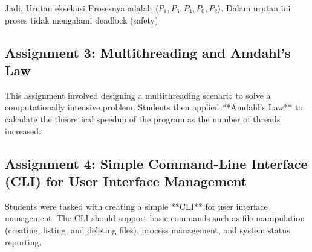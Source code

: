 \documentclass[12pt]{article}
\begin{document}
\begin{table}[H]
    \centering %
    \caption{Tabel Algoritma Safety} %
    \label{tab:your_table2} 
\end{table}

Jadi, Urutan eksekusi Prosesnya adalah  \( \langle P_1, P_3, P_4, P_0, P_2 \rangle \). Dalam urutan ini proses tidak mengalami deadlock (safety)

\subsection{Assignment 3: Multithreading and Amdahl's Law}
This assignment involved designing a multithreading scenario to solve a computationally intensive problem. Students then applied **Amdahl's Law** to calculate the theoretical speedup of the program as the number of threads increased.

\subsection{Assignment 4: Simple Command-Line Interface (CLI) for User Interface Management}
Students were tasked with creating a simple **CLI** for user interface management. The CLI should support basic commands such as file manipulation (creating, listing, and deleting files), process management, and system status reporting.
\end{document}

